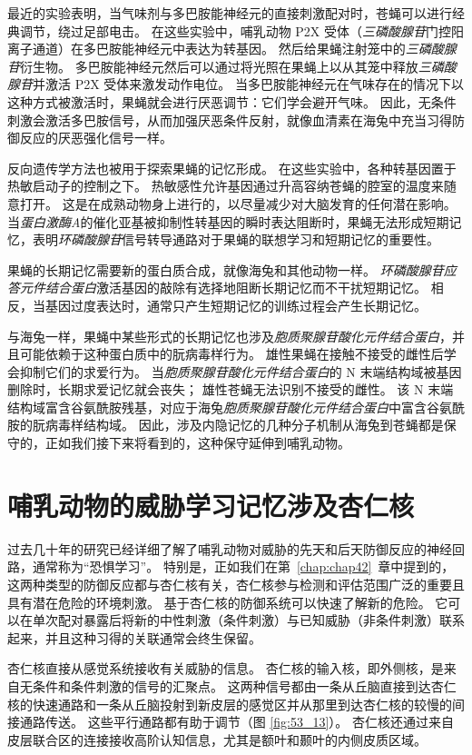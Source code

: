 最近的实验表明，当气味剂与多巴胺能神经元的直接刺激配对时，苍蝇可以进行经典调节，绕过足部电击。
在这些实验中，哺乳动物 P2X 受体（\textit{三磷酸腺苷}门控阳离子通道）在多巴胺能神经元中表达为转基因。
然后给果蝇注射笼中的\textit{三磷酸腺苷}衍生物。
多巴胺能神经元然后可以通过将光照在果蝇上以从其笼中释放\textit{三磷酸腺苷}并激活 P2X 受体来激发动作电位。
当多巴胺能神经元在气味存在的情况下以这种方式被激活时，果蝇就会进行厌恶调节：它们学会避开气味。
因此，无条件刺激会激活多巴胺信号，从而加强厌恶条件反射，就像血清素在海兔中充当习得防御反应的厌恶强化信号一样。


反向遗传学方法也被用于探索果蝇的记忆形成。
在这些实验中，各种转基因置于热敏启动子的控制之下。
热敏感性允许基因通过升高容纳苍蝇的腔室的温度来随意打开。
这是在成熟动物身上进行的，以尽量减少对大脑发育的任何潜在影响。
当\textit{蛋白激酶A}的催化亚基被抑制性转基因的瞬时表达阻断时，果蝇无法形成短期记忆，表明\textit{环磷酸腺苷}信号转导通路对于果蝇的联想学习和短期记忆的重要性。


果蝇的长期记忆需要新的蛋白质合成，就像海兔和其他动物一样。
\textit{环磷酸腺苷应答元件结合蛋白}激活基因的敲除有选择地阻断长期记忆而不干扰短期记忆。
相反，当基因过度表达时，通常只产生短期记忆的训练过程会产生长期记忆。


与海兔一样，果蝇中某些形式的长期记忆也涉及\textit{胞质聚腺苷酸化元件结合蛋白}，并且可能依赖于这种蛋白质中的朊病毒样行为。
雄性果蝇在接触不接受的雌性后学会抑制它们的求爱行为。
当\textit{胞质聚腺苷酸化元件结合蛋白}的 N 末端结构域被基因删除时，长期求爱记忆就会丧失；
雄性苍蝇无法识别不接受的雌性。
该 N 末端结构域富含谷氨酰胺残基，对应于海兔\textit{胞质聚腺苷酸化元件结合蛋白}中富含谷氨酰胺的朊病毒样结构域。
因此，涉及内隐记忆的几种分子机制从海兔到苍蝇都是保守的，正如我们接下来将看到的，这种保守延伸到哺乳动物。



\section{哺乳动物的威胁学习记忆涉及杏仁核}

过去几十年的研究已经详细了解了哺乳动物对威胁的先天和后天防御反应的神经回路，通常称为“恐惧学习”。
特别是，正如我们在第~\ref{chap:chap42}~章中提到的，这两种类型的防御反应都与杏仁核有关，杏仁核参与检测和评估范围广泛的重要且具有潜在危险的环境刺激。
基于杏仁核的防御系统可以快速了解新的危险。
它可以在单次配对暴露后将新的中性刺激（条件刺激）与已知威胁（非条件刺激）联系起来，并且这种习得的关联通常会终生保留。


杏仁核直接从感觉系统接收有关威胁的信息。
杏仁核的输入核，即外侧核，是来自无条件和条件刺激的信号的汇聚点。
这两种信号都由一条从丘脑直接到达杏仁核的快速通路和一条从丘脑投射到新皮层的感觉区并从那里到达杏仁核的较慢的间接通路传送。
这些平行通路都有助于调节（图 \ref{fig:53_13}）。
杏仁核还通过来自皮层联合区的连接接收高阶认知信息，尤其是额叶和颞叶的内侧皮质区域。


